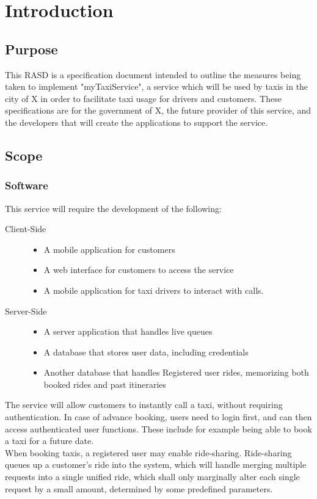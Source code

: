 	\section{Introduction}

\subsection{Purpose}
	This RASD is a specification document intended to outline the measures being taken to implement "myTaxiService", a service which will be used
	by taxis in the city of X in order to facilitate taxi usage for drivers and customers. These specifications are for the government of X, the
	future provider of this service, and the developers that will create the applications to support the service.
\subsection{Scope}
	\subsubsection{Software}
		This service will require the development of the following:
		\begin{description}
			\item[Client-Side] \hfill
				\begin{itemize}
					\item A mobile application for customers
					\item A web interface for customers to access the service
					\item A mobile application for taxi drivers to interact with calls.
				\end{itemize}
			\item[Server-Side] \hfill
				\begin{itemize}
					\item A server application that handles live queues
					\item A database that stores user data, including credentials
					\item Another database that handles Registered user rides, memorizing both booked rides and past itineraries
				\end{itemize}
		\end{description}
		The service will allow customers to instantly call a taxi, without requiring authentication. In case of advance booking, users need to login
		first, and can then access authenticated user functions. These include for example being able to book a taxi for a future date.\\
		When booking taxis, a registered user may enable ride-sharing. Ride-sharing queues up a customer's ride into the system, which will handle merging multiple requests into
		a single unified ride, which shall only marginally alter each single request by a small amount, determined by some predefined parameters.\\
		
